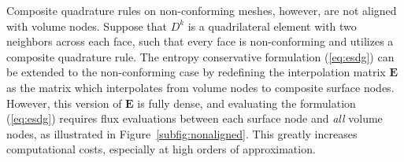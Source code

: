 \documentclass{svjour3}                     %
\begin{document}
Composite quadrature rules on non-conforming meshes, however, are not aligned with volume nodes.  Suppose that $D^k$ is a quadrilateral element with two neighbors across each face, such that every face is non-conforming and utilizes a composite quadrature rule.  The entropy conservative formulation (\ref{eq:esdg}) can be extended to the non-conforming case by redefining the interpolation matrix $\bm{E}$ as the matrix which interpolates from volume nodes to composite surface nodes.  However, this version of $\bm{E}$ is fully dense, and evaluating the formulation (\ref{eq:esdg}) requires flux evaluations between each surface node and \textit{all} volume nodes, as illustrated in Figure~\ref{subfig:nonaligned}.  This greatly increases computational costs, especially at high orders of approximation.  %
\end{document}
